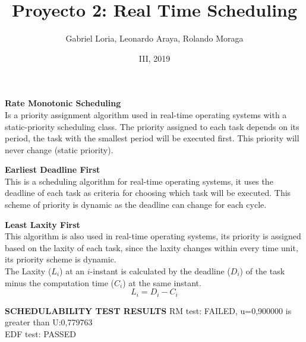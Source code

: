 \documentclass{beamer}
\author{Gabriel Loria, Leonardo Araya, Rolando Moraga}
\institute{ITCR, Maestría en Ingeniería en electr\'onica \\ Dise\~no de Sistemas en Tiempo Real}
\date{III, 2019}
\title{Proyecto 2: Real Time Scheduling}
\begin{document}
\begin{frame}
\titlepage
\end{frame}
\begin{frame}
\textbf{Rate Monotonic Scheduling} \\ Is a priority assignment algorithm used in real-time operating systems with a static-priority scheduling class. The priority assigned to each task depends on its period, the task with the smallest period will be executed first. This priority will never change (static priority).
\end{frame}

\begin{frame}
\textbf{Earliest Deadline First} \\ This is a scheduling algorithm for real-time operating systems, it uses the deadline of each task as criteria for choosing which task will be executed. This scheme of priority is dynamic as the deadline can change for each cycle.
\end{frame}

\begin{frame}
\textbf{Least Laxity First} \\ This algorithm is also used in real-time operating systems, its priority is assigned based on the laxity of each task, since the laxity changes within every time unit, its priority scheme is dynamic. \\ The Laxity ($L_i$) at an $i$-instant is calculated by the deadline ($D_i$) of the task minus the computation time ($C_i$) at the same instant. \[L_i = D_i - C_i\]
\end{frame}





\begin{frame}
\textbf{SCHEDULABILITY TEST RESULTS} 
\newline  RM test: FAILED, u=0,900000 is greater than U:0,779763 \\ 
EDF test: PASSED  
\end{frame}
\end{document}
